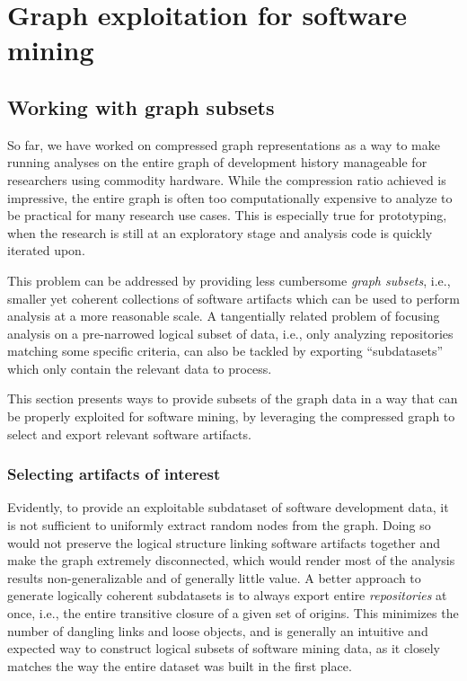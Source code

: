 \chapter{Graph exploitation for software mining}%
\label{chp:graph-exploitation}


\section{Working with graph subsets}

So far, we have worked on compressed graph representations as a way to make
running analyses on the entire graph of development history manageable for
researchers using commodity hardware. While the compression ratio achieved is
impressive, the entire graph is often too computationally expensive to analyze
to be practical for many research use cases.  This is especially true for
prototyping, when the research is still at an exploratory stage and analysis
code is quickly iterated upon.

This problem can be addressed by providing less cumbersome \emph{graph
subsets}, i.e., smaller yet coherent collections of software artifacts which
can be used to perform analysis at a more reasonable scale. A tangentially
related problem of focusing analysis on a pre-narrowed logical subset of data,
i.e., only analyzing repositories matching some specific criteria, can also be
tackled by exporting ``subdatasets'' which only contain the relevant data to
process.

This section presents ways to provide subsets of the graph data in a way that
can be properly exploited for software mining, by leveraging the compressed
graph to select and export relevant software artifacts.

\subsection{Selecting artifacts of interest}

Evidently, to provide an exploitable subdataset of software development data,
it is not sufficient to uniformly extract random nodes from the graph. Doing so
would not preserve the logical structure linking software artifacts together
and make the graph extremely disconnected, which would render most of the
analysis results non-generalizable and of generally little value.
%
A better approach to generate logically coherent subdatasets is to always
export entire \emph{repositories} at once, i.e., the entire transitive closure
of a given set of origins. This minimizes the number of dangling links and
loose objects, and is generally an intuitive and expected way to construct
logical subsets of software mining data, as it closely matches the way the
entire dataset was built in the first place.

